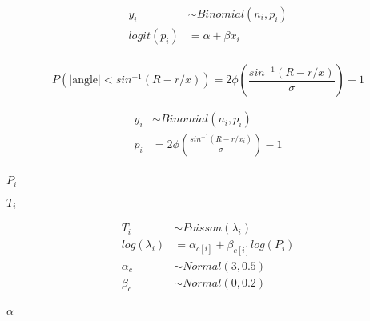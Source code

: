 \documentclass[10pt]{book}
\begin{document}
\begin{mdSnippets}
\begin{mdDisplaySnippet}%
\[%
\begin{aligned}
y_i & \sim Binomial(n_i, p_i) \\
logit(p_i) &= \alpha + \beta x_i \\
\end{aligned}
\]%
\end{mdDisplaySnippet}%
\begin{mdDisplaySnippet}[a1ef2411b39fc937b2304173c1b599d8]%
\[%
P(|\text{angle}| < sin^{-1}(R-r/x)) = 2\phi \left ( \frac{sin^{-1}(R-r/x)}{\sigma} \right ) - 1
\]%
\end{mdDisplaySnippet}%
\begin{mdDisplaySnippet}[4ac78eef26704d0ba029577c80a27506]%
\[%
\begin{aligned}
y_i & \sim Binomial(n_i, p_i) \\
p_i &=  2\phi \left ( \frac{sin^{-1}(R-r/x_i)}{\sigma} \right ) - 1\\
\end{aligned}
\]%
\end{mdDisplaySnippet}%
\begin{mdInlineSnippet}[08b0104e514f16d489cc743b6f66d906]%
{$P_i$}\end{mdInlineSnippet}%
\begin{mdInlineSnippet}[475b78897f974bc7658f55655285a0ff]%
{$T_i$}\end{mdInlineSnippet}%
\begin{mdDisplaySnippet}%
\[%
\begin{aligned}
T_i &\sim Poisson(\lambda_i) \\
log(\lambda_i) &= \alpha_{c[i]} + \beta_{c[i]} log(P_i) \\
\alpha_c &\sim Normal(3, 0.5) \\ 
\beta_c &\sim Normal(0, 0.2) \\
\end{aligned}
\]%
\end{mdDisplaySnippet}%
\begin{mdInlineSnippet}[7b7f9dbfea05c83784f8b85149852f08]%
{$\alpha$}\end{mdInlineSnippet}%

\end{mdSnippets}
\end{document}
